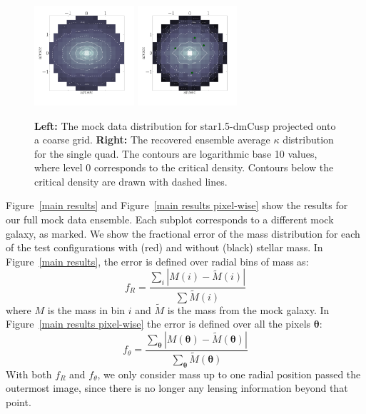 \documentclass[galley,usenatbib]{mn2e}
\newcommand{\figref}[1] {Figure~\ref{#1}}
\renewcommand{\vec}[1]{\ensuremath{\boldsymbol{#1}}}
\newcommand{\mockBC}{{\sc star1.5-dmCusp}}
\begin{document}
\begin{figure}
\includegraphics[width=0.33\textwidth]{BCQuadR1a_TmS-kappa-a.pdf}
\includegraphics[width=0.33\textwidth]{BCQuadR1a_TmS-kappa-b.pdf}
\caption{ \textbf{Left:} The mock data distribution for \mockBC{} projected onto a coarse grid.
  \textbf{Right:} The recovered ensemble average $\kappa$ distribution for the single quad. The contours are
  logarithmic base 10 values, where level 0 corresponds to the critical density. Contours below the critical density
  are drawn with dashed lines.}
\label{2d mass reconstruction}
\end{figure}

\figref{main results} and \figref{main results pixel-wise} show the results for our full mock data ensemble. Each
subplot corresponds to a different mock galaxy, as marked. We show the fractional error of the mass
distribution for each of the test configurations with (red) and without (black)
 stellar mass. In \figref{main results}, the error is defined over radial bins of mass as:
%
\begin{equation} \label{ferror R}
  f_R = \frac {\sum_i \left|M(i) - \tilde M(i)\right| } {\sum \tilde M(i)}
\end{equation}
%
where $M$ is the mass in bin $i$ and $\tilde M$ is the mass from the mock galaxy.
In \figref{main results pixel-wise} the error is defined over all the pixels $\vec\theta$:
%
\begin{equation} \label{ferror theta}
f_\theta = \frac {\sum_{\vec\theta} \left|M(\vec\theta) - \tilde M(\vec\theta)\right| } {\sum_{\vec\theta} \tilde M(\vec\theta)}
\end{equation}
With both $f_R$ and $f_\theta$, we only consider mass up to one radial
position passed the outermost image, since there is no longer any lensing
information beyond that point.
\end{document}
